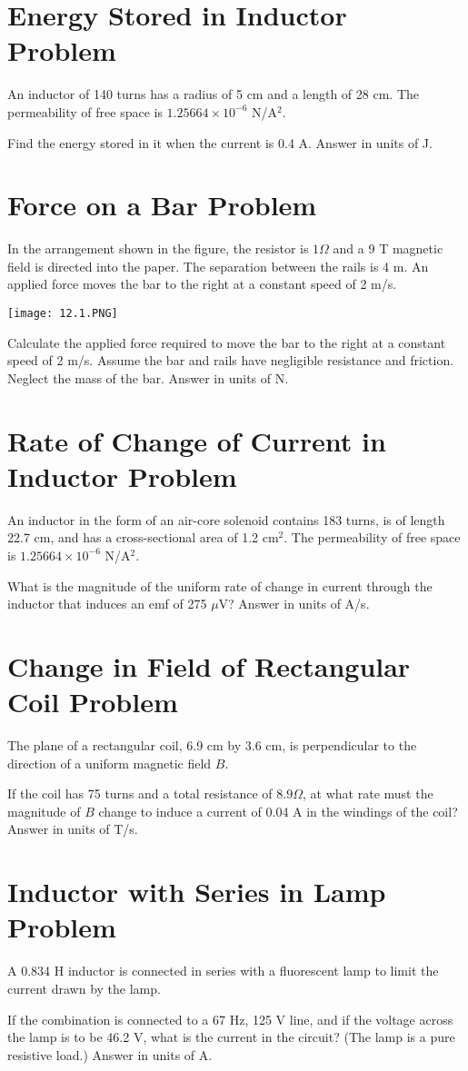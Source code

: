 \documentclass[../physics12.tex]{subfiles}
\begin{document}
\section{Energy Stored in Inductor Problem}
An inductor of 140 turns has a radius of 5 cm and a length of 28 cm. The permeability of free space is $1.25664\times 10^{-6}$ N/A$^2$. 

Find the energy stored in it when the current is 0.4 A. Answer in units of J.

\section{Force on a Bar Problem}
In the arrangement shown in the figure, the resistor is $1 \Omega$ and a 9 T magnetic field is directed into the paper. The separation 
between the rails is 4 m. An applied force moves the bar to the right at a constant speed of 2 m/s.
\begin{center}
    \texttt{[image: 12.1.PNG]}
\end{center}
Calculate the applied force required to move the bar to the right at a constant speed of 2 m/s. Assume the bar and rails have negligible resistance and friction.
Neglect the mass of the bar. Answer in units of N.

\section{Rate of Change of Current in Inductor Problem}
An inductor in the form of an air-core solenoid contains 183 turns, is of length 22.7 cm, and has a cross-sectional area of 1.2 cm$^2$. The permeability of free space is $1.25664\times 10^{-6}$ N/A$^2$.

What is the magnitude of the uniform rate of change in current through the inductor that induces an emf of 275 $\mu$V? Answer in units of A/s.

\section{Change in Field of Rectangular Coil Problem}
The plane of a rectangular coil, 6.9 cm by 3.6 cm, is perpendicular to the direction of a uniform magnetic field $B$.

If the coil has 75 turns and a total resistance of $8.9 \Omega$, at what rate must the magnitude of $B$ change to induce a current of 0.04 A in the windings of the coil? Answer in units of T/s.

\section{Inductor with Series in Lamp Problem}
A 0.834 H inductor is connected in series with a fluorescent lamp to limit the current drawn by the lamp.

If the combination is connected to a 67 Hz, 125 V line, and if the voltage across the lamp is to be 46.2 V, what is the current in the circuit? (The lamp is a pure resistive load.) Answer in units of A.
\end{document}
